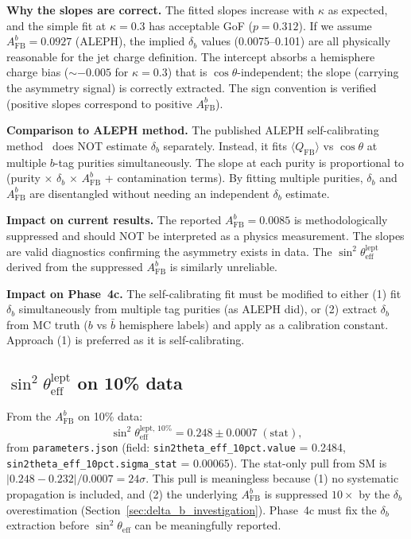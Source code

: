 \documentclass[11pt,a4paper]{article}
\begin{document}
\textbf{Why the slopes are correct.} The fitted slopes increase with $\kappa$ as
expected, and the simple fit at $\kappa = 0.3$ has acceptable GoF ($p = 0.312$).
If we assume $A_\mathrm{FB}^b = 0.0927$ (ALEPH), the implied $\delta_b$ values
(0.0075--0.101) are all physically reasonable for the jet charge definition.
The intercept absorbs a hemisphere charge bias ($\sim -0.005$ for $\kappa = 0.3$)
that is $\cos\theta$-independent; the slope (carrying the asymmetry signal) is
correctly extracted. The sign convention is verified (positive slopes correspond
to positive $A_\mathrm{FB}^b$).

\textbf{Comparison to ALEPH method.} The published ALEPH self-calibrating
method~\cite{ALEPH:AFBb} does NOT estimate $\delta_b$ separately. Instead, it fits
$\langle Q_\mathrm{FB} \rangle$ vs $\cos\theta$ at multiple $b$-tag purities
simultaneously. The slope at each purity is proportional to
(purity $\times$ $\delta_b$ $\times$ $A_\mathrm{FB}^b$ + contamination terms).
By fitting multiple purities, $\delta_b$ and $A_\mathrm{FB}^b$ are disentangled
without needing an independent $\delta_b$ estimate.

\textbf{Impact on current results.} The reported $A_\mathrm{FB}^b = 0.0085$ is
methodologically suppressed and should NOT be interpreted as a physics measurement.
The slopes are valid diagnostics confirming the asymmetry exists in data. The
$\sin^2\theta_\mathrm{eff}^\mathrm{lept}$ derived from the suppressed
$A_\mathrm{FB}^b$ is similarly unreliable.

\textbf{Impact on Phase~4c.} The self-calibrating fit must be modified to either
(1) fit $\delta_b$ simultaneously from multiple tag purities (as ALEPH did), or
(2) extract $\delta_b$ from MC truth ($b$ vs $\bar{b}$ hemisphere labels) and apply
as a calibration constant. Approach (1) is preferred as it is self-calibrating.

\subsection{$\sin^2\theta_\mathrm{eff}^\mathrm{lept}$ on 10\% data}
\label{sec:result_sin2theta_10pct}

From the $A_\mathrm{FB}^b$ on 10\% data:
\begin{equation}
\sin^2\theta_\mathrm{eff}^{\mathrm{lept},\,10\%} = 0.248 \pm 0.0007\;\mathrm{(stat)},
\label{eq:sin2theta_10pct}
\end{equation}
from \texttt{parameters.json} (field: \texttt{sin2theta\_eff\_10pct.value} = 0.2484,
\texttt{sin2theta\_eff\_10pct.sigma\_stat} = 0.00065).
The stat-only pull from SM is $|0.248 - 0.232| / 0.0007 = 24\sigma$. This pull is
meaningless because (1) no systematic propagation is included, and (2) the underlying
$A_\mathrm{FB}^b$ is suppressed $10\times$ by the $\delta_b$ overestimation
(Section~\ref{sec:delta_b_investigation}). Phase~4c must fix the $\delta_b$ extraction
before $\sin^2\theta_\mathrm{eff}$ can be meaningfully reported.
\end{document}
